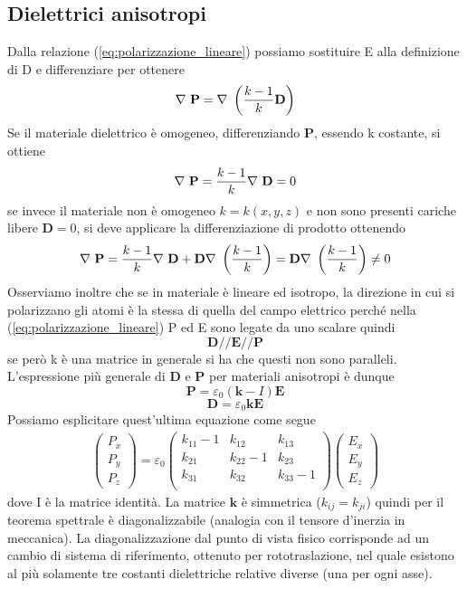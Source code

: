 \documentclass[
10pt, %
a4paper, %
oneside, %
headinclude,footinclude, %
BCOR5mm, %
]{scrartcl}
\begin{document}
\subsection{Dielettrici anisotropi}
Dalla relazione (\ref{eq:polarizzazione_lineare}) possiamo sostituire E alla definizione di D e differenziare per ottenere
\[\mathbf{\nabla\ }\mathbf{P} = \mathbf{\nabla\ }\left(\frac{k-1}{k}\mathbf{D}\right)\]
Se il materiale dielettrico è omogeneo, differenziando $\mathbf{P}$, essendo k costante, si ottiene 
\[\mathbf{\nabla\ }\mathbf{P} = \frac{k-1}{k}\mathbf{\nabla\ }\mathbf{D} = 0\] 
se invece il materiale non è omogeneo \(k=k(x,y,z)\) e non sono presenti cariche libere \(\mathbf{D} = 0\), si deve applicare la differenziazione di prodotto ottenendo
\[\mathbf{\nabla\ }\mathbf{P} = \frac{k-1}{k}\mathbf{\nabla\ }\mathbf{D} + \mathbf{D}\mathbf{\nabla\ }\left(\frac{k-1}{k}\right)= \mathbf{D}\mathbf{\nabla\ }\left(\frac{k-1}{k}\right)\neq 0\]
Osserviamo inoltre che se in materiale è lineare ed isotropo, la direzione in cui si polarizzano gli atomi è la stessa di quella del campo elettrico perché nella (\ref{eq:polarizzazione_lineare}) P ed E sono legate da uno scalare quindi
\[\mathbf{D}//\mathbf{E}//\mathbf{P}\]
se però k è una matrice in generale si ha che questi non sono paralleli. L'espressione più generale di $\mathbf{D}$ e $\mathbf{P}$ per materiali anisotropi è dunque
\[\mathbf{P} = \varepsilon_0 (\mathbf{k}-I)\mathbf{E}\]
\[\mathbf{D} = \varepsilon_0\mathbf{k}\mathbf{E}\]
Possiamo esplicitare quest'ultima equazione come segue
\begin{align*}
	\begin{pmatrix}
	P_x\\
	P_y\\
	P_z
	\end{pmatrix}
=\varepsilon_0
	\begin{pmatrix}
		k_{11}-1&k_{12}&k_{13}\\
		k_{21}&k_{22}-1&k_{23}\\
		k_{31}&k_{32}&k_{33}-1\\
	\end{pmatrix}
	\begin{pmatrix}
		E_x\\
		E_y\\
		E_z
	\end{pmatrix}
\end{align*}
dove I è la matrice identità. La matrice $\mathbf{k}$ è simmetrica (\(k_{ij} = k_{ji}\)) quindi per il teorema spettrale è diagonalizzabile (analogia con il tensore d'inerzia in meccanica). La diagonalizzazione dal punto di vista fisico corrisponde ad un cambio di sistema di riferimento, ottenuto per rototraslazione, nel quale esistono al più solamente tre costanti dielettriche relative diverse (una per ogni asse).
\end{document}
